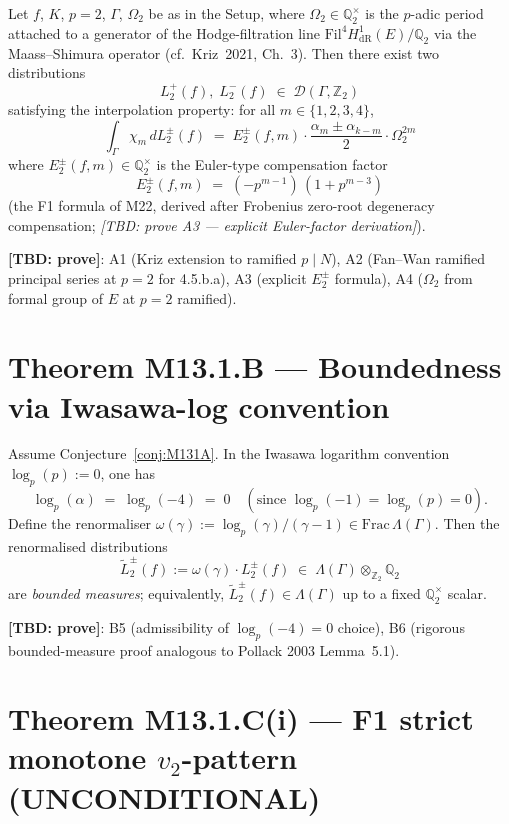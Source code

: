 \begin{conjecture}[M13.1.A]
\label{conj:M131A}
Let $f$, $K$, $p=2$, $\Gamma$, $\Omega_2$ be as in the Setup, where
$\Omega_2 \in \mathbb{Q}_2^\times$ is the $p$-adic period attached to a
generator of the Hodge-filtration line $\mathrm{Fil}^4 H^1_{\mathrm{dR}}(E)/\mathbb{Q}_2$
via the Maass–Shimura operator (cf.\ Kriz~2021, Ch.~3). Then there exist
two distributions
\[
L_2^+(f),\; L_2^-(f) \;\in\; \mathcal{D}(\Gamma,\mathbb{Z}_2)
\]
satisfying the interpolation property: for all $m \in \{1,2,3,4\}$,
\[
\boxed{\;
\int_\Gamma \chi_m\, dL_2^\pm(f) \;=\; E_2^\pm(f,m) \cdot
\frac{\alpha_m \pm \alpha_{k-m}}{2} \cdot \Omega_2^{2m}
\;}
\]
where $E_2^\pm(f,m) \in \mathbb{Q}_2^\times$ is the Euler-type compensation factor
\[
E_2^\pm(f,m) \;=\; (-p^{m-1})\,(1+p^{m-3})
\]
(the F1 formula of M22, derived after Frobenius zero-root degeneracy
compensation; \emph{[TBD: prove A3 — explicit Euler-factor derivation]}).
\end{conjecture}

\textbf{[TBD: prove]}: A1 (Kriz extension to ramified $p\mid N$), A2 (Fan–Wan
ramified principal series at $p=2$ for 4.5.b.a), A3 (explicit $E_2^\pm$ formula),
A4 ($\Omega_2$ from formal group of $E$ at $p=2$ ramified).

\section{Theorem M13.1.B — Boundedness via Iwasawa-log convention}

\begin{conjecture}[M13.1.B]
\label{conj:M131B}
Assume Conjecture~\ref{conj:M131A}. In the Iwasawa logarithm convention
$\log_p(p) := 0$, one has
\[
\log_p(\alpha) \;=\; \log_p(-4) \;=\; 0 \quad (\text{since } \log_p(-1) = \log_p(p) = 0).
\]
Define the renormaliser
$\omega(\gamma) := \log_p(\gamma)/(\gamma - 1) \in \mathrm{Frac}\,\Lambda(\Gamma)$.
Then the renormalised distributions
\[
\widetilde{L}_2^\pm(f) := \omega(\gamma) \cdot L_2^\pm(f)
\;\in\; \Lambda(\Gamma)\otimes_{\mathbb{Z}_2}\mathbb{Q}_2
\]
are \emph{bounded measures}; equivalently, $\widetilde{L}_2^\pm(f) \in
\Lambda(\Gamma)$ up to a fixed $\mathbb{Q}_2^\times$ scalar.
\end{conjecture}

\textbf{[TBD: prove]}: B5 (admissibility of $\log_p(-4)=0$ choice), B6
(rigorous bounded-measure proof analogous to Pollack 2003 Lemma~5.1).

\section{Theorem M13.1.C(i) — F1 strict monotone $v_2$-pattern (UNCONDITIONAL)}

